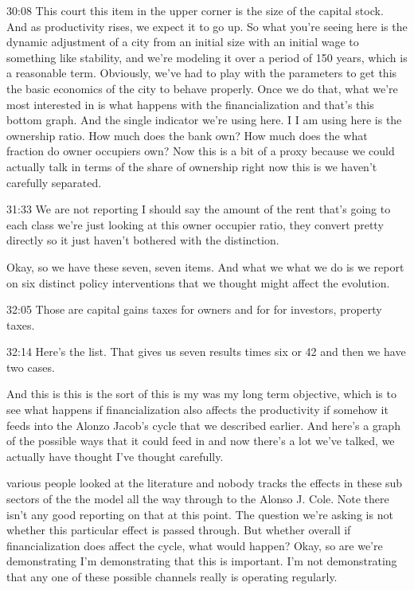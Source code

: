 \documentclass[]{article}
\begin{document}
30:08
This court this item in the upper corner is the size of the capital stock. And as productivity rises, we expect it to go up. So what you're seeing here is the dynamic adjustment of a city from an initial size with an initial wage to something like stability, and we're modeling it over a period of 150 years, which is a reasonable term. Obviously, we've had to play with the parameters to get this the basic economics of the city to behave properly. Once we do that, what we're most interested in is what happens with the financialization and that's this bottom graph. And the single indicator we're using here. I I am using here is the ownership ratio. How much does the bank own? How much does the what fraction do owner occupiers own? Now this is a bit of a proxy because we could actually talk in terms of the share of ownership right now this is we haven't carefully separated.

31:33
We are not reporting I should say the amount of the rent that's going to each class we're just looking at this owner occupier ratio, they convert pretty directly so it just haven't bothered with the distinction.

Okay, so we have these seven, seven items. And what we what we do is we report on six distinct policy interventions that we thought might affect the evolution.

32:05
Those are capital gains taxes for owners and for for investors, property taxes.

32:14
Here's the list.
That gives us seven results times six or 42 and then we have two cases. 

And this is this is the sort of this is my was my long term objective, which is to see what happens if financialization also affects the productivity if somehow it feeds into the Alonzo Jacob's cycle that we described earlier. And here's a graph of the possible ways that it could feed in and now there's a lot we've talked, we actually have thought I've thought carefully. 

various people looked at the literature and nobody tracks the effects in these sub sectors of the the model all the way through to the Alonso J. Cole. Note there isn't any good reporting on that at this point. The question we're asking is not whether this particular effect is passed through. But whether overall if financialization does affect the cycle, what would happen? Okay, so are we're demonstrating I'm demonstrating that this is important. I'm not demonstrating that any one of these possible channels really is operating regularly.
\end{document}
